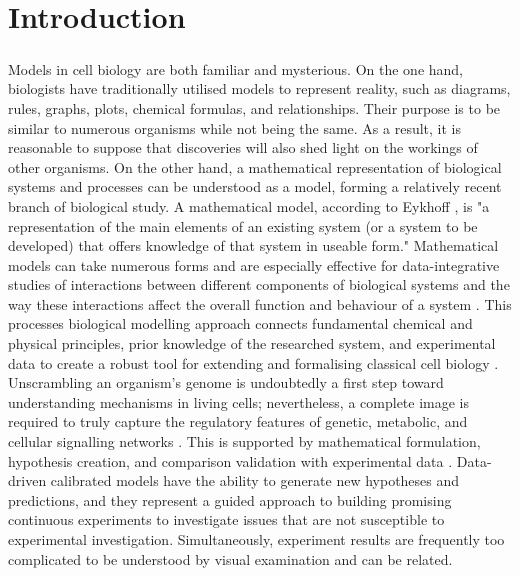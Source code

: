 \chapter{Introduction}
\label{chap:01}


\paragraph{}


 Models in cell biology are both familiar and mysterious. On the one hand, biologists have traditionally utilised models to represent reality, such as diagrams, rules, graphs, plots, chemical formulas, and relationships. Their purpose is to be similar to numerous organisms while not being the same. As a result, it is reasonable to suppose that discoveries will also shed light on the workings of other organisms. On the other hand, a mathematical representation of biological systems and processes can be understood as a model, forming a relatively recent branch of biological study. A mathematical model, according to Eykhoff \cite{serra2011using}, is "a representation of the main elements of an existing system (or a system to be developed) that offers knowledge of that system in useable form." Mathematical models can take numerous forms and are especially effective for data-integrative studies of interactions between different components of biological systems and the way these interactions affect the overall function and behaviour of a system \cite{kapur1988mathematical}. This processes biological modelling approach connects fundamental chemical and physical principles, prior knowledge of the researched system, and experimental data to create a robust tool for extending and formalising classical cell biology \cite{motta2013mathematical,friedman2014mathematical}. Unscrambling an organism's genome is undoubtedly a first step toward understanding mechanisms in living cells; nevertheless, a complete image is required to truly capture the regulatory features of genetic, metabolic, and cellular signalling networks \cite{gold1977mathematical}. This is supported by mathematical formulation, hypothesis creation, and comparison validation with experimental data \cite{almeida2021formulation}. Data-driven calibrated models have the ability to generate new hypotheses and predictions, and they represent a guided approach to building promising continuous experiments to investigate issues that are not susceptible to experimental investigation. Simultaneously, experiment results are frequently too complicated to be understood by visual examination and can be related.
 


